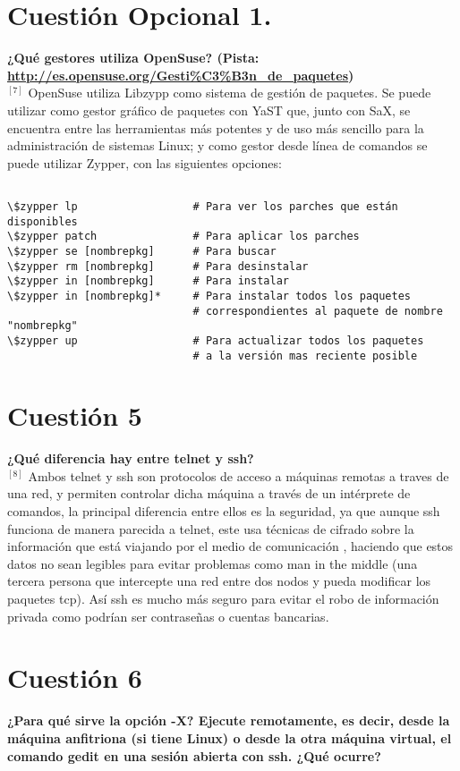 \documentclass[a4paper, 11pt]{article} %
\begin{document}
\section{Cuestión Opcional 1.}
\textbf{¿Qué gestores utiliza OpenSuse? (Pista: \url{http://es.opensuse.org/Gesti\%C3\%B3n_de_paquetes})}\\

$^{[7]}$ OpenSuse utiliza Libzypp como sistema de gestión de paquetes. Se puede utilizar como gestor gráfico de paquetes con YaST que, junto con SaX, se encuentra entre las herramientas más potentes y de uso más sencillo para la administración de sistemas Linux; y como gestor desde línea de comandos se puede utilizar Zypper, con las siguientes opciones:
\begin{verbatim}

\$zypper lp                  # Para ver los parches que están disponibles
\$zypper patch               # Para aplicar los parches
\$zypper se [nombrepkg]      # Para buscar 
\$zypper rm [nombrepkg]      # Para desinstalar
\$zypper in [nombrepkg]      # Para instalar
\$zypper in [nombrepkg]*     # Para instalar todos los paquetes
                             # correspondientes al paquete de nombre "nombrepkg"
\$zypper up                  # Para actualizar todos los paquetes
                             # a la versión mas reciente posible
\end{verbatim}



\section{Cuestión 5}
\textbf{¿Qué diferencia hay entre telnet y ssh?}\\

$^{[8]}$ Ambos telnet y ssh son protocolos de acceso a máquinas remotas a traves de una red, y permiten controlar dicha máquina a través de un intérprete de comandos, la principal diferencia entre ellos es la seguridad, ya que aunque ssh funciona de manera parecida a telnet, este usa técnicas de cifrado sobre la información que está viajando por el medio de comunicación , haciendo que estos datos no sean legibles para evitar problemas como man in the middle (una tercera persona que intercepte una red entre dos nodos y pueda modificar los paquetes tcp). Así ssh es mucho más seguro para evitar el robo de información privada como podrían ser contraseñas o cuentas bancarias.


\section{Cuestión 6}
\textbf{¿Para qué sirve la opción -X? Ejecute remotamente, es decir, desde la máquina anfitriona (si tiene Linux) o desde la otra máquina virtual, el comando gedit en una sesión abierta con ssh. ¿Qué ocurre?}\\
\end{document}
